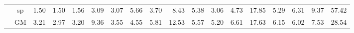 \begin{table*}[]
{\begin{tabular}{|c|c|rrrr|rrrr|rrrr|rrrr|}
 &  sp  &  1.50  &  1.50  &  1.56  &   3.09  &  3.07  &   5.66  & \cellcolor{blue!25}  3.70  &   8.43  &   5.38  & \cellcolor{blue!25}  3.06  &   4.73  &  17.85  &  5.29  &  6.31  &  9.37  &  57.42 \\
 &  GM  &  3.21  & \cellcolor{blue!25} 2.97  &  3.20  &   9.36  &  3.55  &   4.55  &   5.81  &  12.53  &   5.57  & \cellcolor{blue!25}  5.20  &   6.61  &  17.63  &  6.15  & \cellcolor{blue!25} 6.02  &  7.53  &  28.54 \\
\hline 
\end{tabular} }

\end{table*}